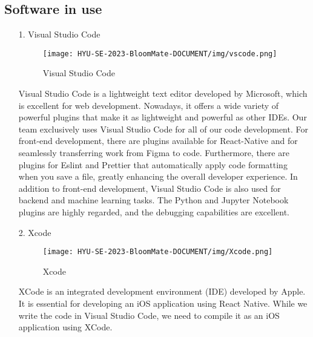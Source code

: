 \documentclass[conference, a4paper]{IEEEtran}
\begin{document}
\subsection{Software in use}
\begin{enumerate}
    \item[1.]Visual Studio Code
    \begin{figure}[h]
    \centering
    \texttt{[image: HYU-SE-2023-BloomMate-DOCUMENT/img/vscode.png]}
    \label{fig:VScode}
    \caption{Visual Studio Code} 
    \end{figure}
    \item[]Visual Studio Code is a lightweight text editor developed by Microsoft, which is excellent for web development. Nowadays, it offers a wide variety of powerful plugins that make it as lightweight and powerful as other IDEs. Our team exclusively uses Visual Studio Code for all of our code development. For front-end development, there are plugins available for React-Native and for seamlessly transferring work from Figma to code. Furthermore, there are plugins for Eslint and Prettier that automatically apply code formatting when you save a file, greatly enhancing the overall developer experience. In addition to front-end development, Visual Studio Code is also used for backend and machine learning tasks. The Python and Jupyter Notebook plugins are highly regarded, and the debugging capabilities are excellent.\\
  

    \item[2.]Xcode
    \begin{figure}[h]
    \centering
    \texttt{[image: HYU-SE-2023-BloomMate-DOCUMENT/img/Xcode.png]}
    \label{fig:Xcode}
    \caption{Xcode} 
    \end{figure}
    \item[]XCode is an integrated development environment (IDE) developed by Apple. It is essential for developing an iOS application using React Native. While we write the code in Visual Studio Code, we need to compile it as an iOS application using XCode.\\
    

\end{enumerate}
\end{document}
